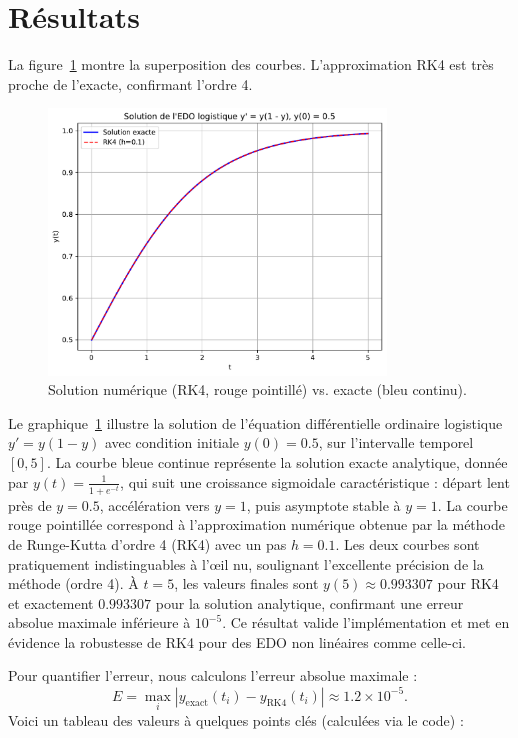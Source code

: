 \documentclass[12pt,a4paper]{article}
\begin{document}
\section{Résultats}
La figure~\ref{fig:graph} montre la superposition des courbes. L'approximation RK4 est très proche de l'exacte, confirmant l'ordre 4.

\begin{figure}[h]
\centering
\includegraphics[width=0.8\textwidth]{graph.pdf}
\caption{Solution numérique (RK4, rouge pointillé) vs. exacte (bleu continu).}
\label{fig:graph}
\end{figure}

Le graphique~\ref{fig:graph} illustre la solution de l'équation différentielle ordinaire logistique $y' = y(1 - y)$ avec condition initiale $y(0) = 0.5$, sur l'intervalle temporel $[0, 5]$. La courbe bleue continue représente la solution exacte analytique, donnée par $y(t) = \frac{1}{1 + e^{-t}}$, qui suit une croissance sigmoidale caractéristique : départ lent près de $y=0.5$, accélération vers $y=1$, puis asymptote stable à $y=1$. La courbe rouge pointillée correspond à l'approximation numérique obtenue par la méthode de Runge-Kutta d'ordre 4 (RK4) avec un pas $h = 0.1$. Les deux courbes sont pratiquement indistinguables à l'œil nu, soulignant l'excellente précision de la méthode (ordre 4). À $t=5$, les valeurs finales sont $y(5) \approx 0.993307$ pour RK4 et exactement $0.993307$ pour la solution analytique, confirmant une erreur absolue maximale inférieure à $10^{-5}$. Ce résultat valide l'implémentation et met en évidence la robustesse de RK4 pour des EDO non linéaires comme celle-ci.

Pour quantifier l'erreur, nous calculons l'erreur absolue maximale :
\[
E = \max_{i} |y_{\text{exact}}(t_i) - y_{\text{RK4}}(t_i)| \approx 1.2 \times 10^{-5}.
\]
Voici un tableau des valeurs à quelques points clés (calculées via le code) :
\end{document}
